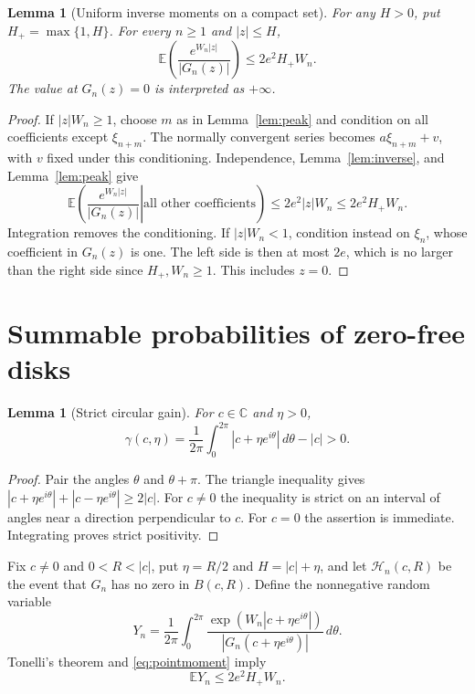 \documentclass[11pt]{article}
\newtheorem{lemma}[theorem]{Lemma}
\theoremstyle{remark}
\newcommand{\C}{\mathbb C}
\newcommand{\E}{\mathbb E}
\newcommand{\dd}{\,d}
\newcommand{\avint}{\frac{1}{2\pi}\int_0^{2\pi}}
\begin{document}
\begin{lemma}[Uniform inverse moments on a compact set]
\label{lem:pointmoment}
For any $H>0$, put $H_+=\max\{1,H\}$. For every $n\geq1$ and
$|z|\leq H$,
\begin{equation}\label{eq:pointmoment}
 \E\left(\frac{e^{W_n|z|}}{|G_n(z)|}\right)
 \leq 2e^2H_+W_n.
\end{equation}
The value at $G_n(z)=0$ is interpreted as $+\infty$.
\end{lemma}
\begin{proof}
If $|z|W_n\geq1$, choose $m$ as in Lemma~\ref{lem:peak} and
condition on all coefficients except $\xi_{n+m}$. The normally
convergent series becomes $a\xi_{n+m}+v$, with $v$ fixed under this
conditioning. Independence, Lemma~\ref{lem:inverse}, and
Lemma~\ref{lem:peak} give
\[
 \E\left(\left.\frac{e^{W_n|z|}}{|G_n(z)|}\right|
                  \text{all other coefficients}\right)
 \leq2e^2|z|W_n\leq2e^2H_+W_n.
\]
Integration removes the conditioning.
If $|z|W_n<1$, condition instead on $\xi_n$, whose coefficient
in $G_n(z)$ is one. The left side is then at most $2e$,
which is no larger than the right side since $H_+,W_n\geq1$.
This includes $z=0$.
\end{proof}

\section{Summable probabilities of zero-free disks}

\begin{lemma}[Strict circular gain]\label{lem:gain}
For $c\in\C$ and $\eta>0$,
\[
 \gamma(c,\eta)=\avint|c+\eta e^{i\theta}|\dd\theta-|c|>0.
\]
\end{lemma}
\begin{proof}
Pair the angles $\theta$ and $\theta+\pi$. The triangle inequality
gives $|c+\eta e^{i\theta}|+|c-\eta e^{i\theta}|\geq2|c|$.
For $c\neq0$ the inequality is strict on an interval of angles near
a direction perpendicular to $c$. For $c=0$ the assertion is
immediate. Integrating proves strict positivity.
\end{proof}

Fix $c\neq0$ and $0<R<|c|$, put $\eta=R/2$ and
$H=|c|+\eta$, and let $\mathcal H_n(c,R)$ be the event that
$G_n$ has no zero in $B(c,R)$. Define the nonnegative random variable
\begin{equation}\label{eq:Y}
 Y_n=\avint
 \frac{\exp(W_n|c+\eta e^{i\theta}|)}
 {|G_n(c+\eta e^{i\theta})|}\dd\theta.
\end{equation}
Tonelli's theorem and \eqref{eq:pointmoment} imply
\begin{equation}\label{eq:Ymean}
 \E Y_n\leq2e^2H_+W_n.
\end{equation}
\end{document}

